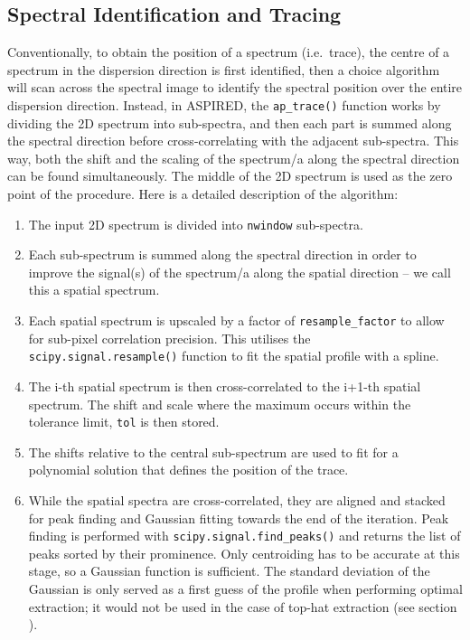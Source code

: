 \documentclass[twocolumn, linenumbers]{aastex631}
\begin{document}
\subsection{Spectral Identification and Tracing}
\label{sec:tracing}
Conventionally, to obtain the position of a spectrum (i.e.\ trace), the centre of
a spectrum in the dispersion direction is first identified, then a choice
algorithm will scan across the spectral image to identify the spectral position
over the entire dispersion direction. Instead, in \textsc{ASPIRED}, the \texttt{ap\_trace()}
function works by dividing the 2D spectrum into sub-spectra, and then each part
is summed along the spectral direction before cross-correlating with the adjacent
sub-spectra. This way, both the shift and the scaling of the spectrum/a along the
spectral direction can be found simultaneously. The middle of the
2D spectrum is used as the zero point of the procedure. Here is a
detailed description of the algorithm:
\begin{enumerate}
    \item
        The input 2D spectrum is divided into \texttt{nwindow}
        sub-spectra.
    \item
        Each sub-spectrum is summed along the spectral direction
        in order to improve the signal(s) of the spectrum/a along
        the spatial direction – we call this a spatial spectrum.
    \item
        Each spatial spectrum is upscaled by a factor of
        \texttt{resample\_factor} to allow for sub-pixel correlation
        precision. This utilises the \texttt{scipy.signal.resample()}
        function to fit the spatial profile with a spline.
    \item
        The i-th spatial spectrum is then cross-correlated to the i+1-th
        spatial spectrum. The shift and scale where the maximum
        occurs within the tolerance limit, \texttt{tol} is then stored.
    \item
        The shifts relative to the central sub-spectrum are used to
        fit for a polynomial solution that defines the position of
        the trace.
    \item
        While the spatial spectra are cross-correlated, they
        are aligned and stacked for peak finding and Gaussian fitting
        towards the end of the iteration. Peak finding is performed with
        \texttt{scipy.signal.find\_peaks()} and returns the list of
        peaks sorted by their prominence. Only centroiding has to be
        accurate at this stage, so a Gaussian function is sufficient.
        The standard deviation of the Gaussian is only served as a
        first guess of the profile when performing optimal extraction;
        it would not be used in the case of top-hat extraction (see
        section ).
\end{enumerate}
\end{document}
